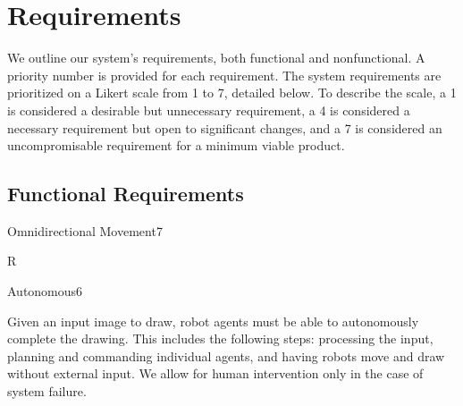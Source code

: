 
\section{Requirements}
\label{sec:requirements}
We outline our system's requirements, both functional and nonfunctional. A priority number is provided for each requirement. The system requirements are prioritized on a Likert scale from 1 to 7, detailed below. To describe the scale, a 1 is considered a desirable but unnecessary requirement, a 4 is considered a necessary requirement but open to significant changes, and a 7 is considered an uncompromisable requirement for a minimum viable product.


\subsection{Functional Requirements}
\label{sec:functional_requirements}



\begin{functional_requirement}{Omnidirectional Movement}{7}
\label{fr:omnidirectional}
\item R
\end{functional_requirement}

\begin{functional_requirement}{Autonomous}{6}
\label{fr:autonomous}
\item Given an input image to draw, robot agents must be able to autonomously complete the drawing. This includes the following steps: processing the input, planning and commanding individual agents, and having robots move and draw without external input. We allow for human intervention only in the case of system failure. 
\end{functional_requirement}

